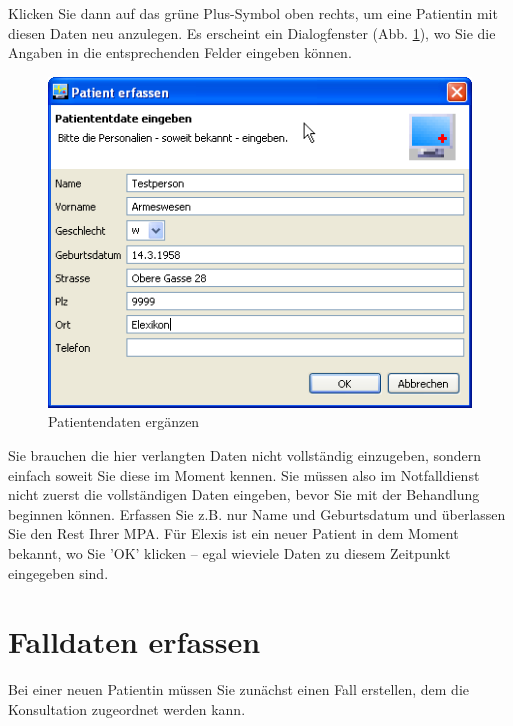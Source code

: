 Klicken Sie dann auf das grüne Plus-Symbol oben rechts, um eine Patientin mit diesen
Daten neu anzulegen. Es erscheint ein Dialogfenster (Abb. \ref{fig:patdata}), wo
Sie die Angaben in die entsprechenden Felder eingeben können.\\
\bigskip

\begin{figure}[ht]
	\includegraphics{images/einf2}
	\caption{Patientendaten ergänzen}
	\label{fig:patdata}
\end{figure}
Sie brauchen die hier verlangten Daten nicht vollständig einzugeben, sondern einfach soweit Sie diese im Moment kennen.
Sie müssen also im Notfalldienst nicht zuerst die vollständigen Daten eingeben, bevor Sie mit der Behandlung beginnen können.
Erfassen Sie z.B. nur Name und Geburtsdatum und überlassen Sie den Rest Ihrer MPA. Für Elexis ist ein neuer Patient in dem Moment bekannt,
wo Sie 'OK' klicken -- egal wieviele Daten zu diesem Zeitpunkt eingegeben sind.

\section{Falldaten erfassen}
Bei einer neuen Patientin müssen Sie zunächst einen \glqq Fall\grqq{} erstellen, dem
die Konsultation zugeordnet werden kann.

